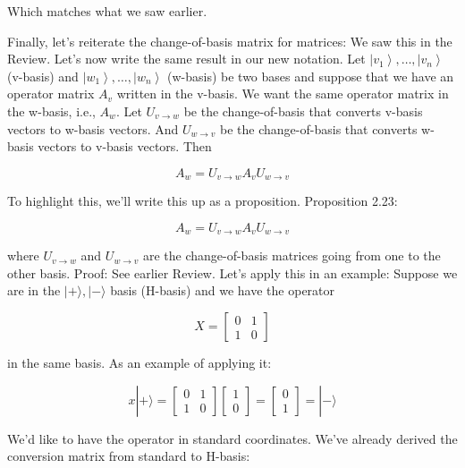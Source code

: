 \documentclass[main.tex]{subfiles}
\begin{document}
    Which matches what we saw earlier.
    
    Finally, let's reiterate the change-of-basis matrix for matrices: We saw this in the Review. Let's now write the same result in our new notation. Let $\left|v_{1}\right\rangle, \ldots,\left|v_{n}\right\rangle$ (v-basis) and $\left|w_{1}\right\rangle, \ldots,\left|w_{n}\right\rangle$ (w-basis) be two bases and suppose that we have an operator matrix $A_{v}$ written in the v-basis. We want the same operator matrix in the w-basis, i.e., $A_{w}$. Let $U_{v \rightarrow w}$ be the change-of-basis that converts v-basis vectors to w-basis vectors. And $U_{w \rightarrow v}$ be the change-of-basis that converts w-basis vectors to v-basis vectors. Then
    
    $$
    A_{w}=U_{v \rightarrow w} A_{v} U_{w \rightarrow v}
    $$
    
    To highlight this, we'll write this up as a proposition. Proposition 2.23:
    
    $$
    A_{w}=U_{v \rightarrow w} A_{v} U_{w \rightarrow v}
    $$
    
    where $U_{v \rightarrow w}$ and $U_{w \rightarrow v}$ are the change-of-basis matrices going from one to the other basis. Proof: See earlier Review. Let's apply this in an example: Suppose we are in the $|+\rangle,|-\rangle$ basis (H-basis) and we have the operator
    
    $$
    X=\left[\begin{array}{ll}
    0 & 1 \\
    1 & 0
    \end{array}\right]
    $$
    
    in the same basis. As an example of applying it:
    
    $$
    x|+\rangle=\left[\begin{array}{ll}
    0 & 1 \\
    1 & 0
    \end{array}\right]\left[\begin{array}{l}
    1 \\
    0
    \end{array}\right]=\left[\begin{array}{l}
    0 \\
    1
    \end{array}\right]=|-\rangle
    $$
    
    We'd like to have the operator in standard coordinates. We've already derived the conversion matrix from standard to H-basis:
    
\end{document}
